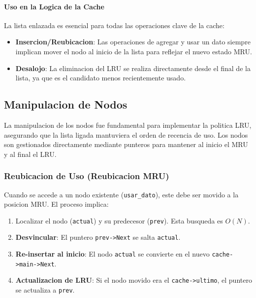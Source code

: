     \paragraph{Uso en la Logica de la Cache}
    La lista enlazada es esencial para todas las operaciones clave de la cache:
    \begin{itemize}
        \item \textbf{Insercion/Reubicacion}: Las operaciones de agregar y usar un dato siempre implican mover el nodo al inicio de la lista para reflejar el nuevo estado MRU.
        \item \textbf{Desalojo}: La eliminacion del LRU se realiza directamente desde el final de la lista, ya que es el candidato menos recientemente usado.
    \end{itemize}

    \subsection{Manipulacion de Nodos}
    La manipulacion de los nodos fue fundamental para implementar la politica LRU, asegurando que la lista ligada mantuviera el orden de recencia de uso. Los nodos son gestionados directamente mediante punteros para mantener al inicio el MRU y al final el LRU.

        \subsubsection*{Reubicacion de Uso (Reubicacion MRU)}
        Cuando se accede a un nodo existente (\texttt{usar\_dato}), este debe ser movido a la posicion MRU. El proceso implica:
        \begin{enumerate}
            \item Localizar el nodo (\texttt{actual}) y su predecesor (\texttt{prev}). Esta busqueda es $O(N)$.
            \item \textbf{Desvincular}: El puntero \texttt{prev->Next} se salta \texttt{actual}.
            \item \textbf{Re-insertar al inicio}: El nodo \texttt{actual} se convierte en el nuevo \texttt{cache->main->Next}.
            \item \textbf{Actualizacion de LRU}: Si el nodo movido era el \texttt{cache->ultimo}, el puntero se actualiza a \texttt{prev}.
        \end{enumerate}


